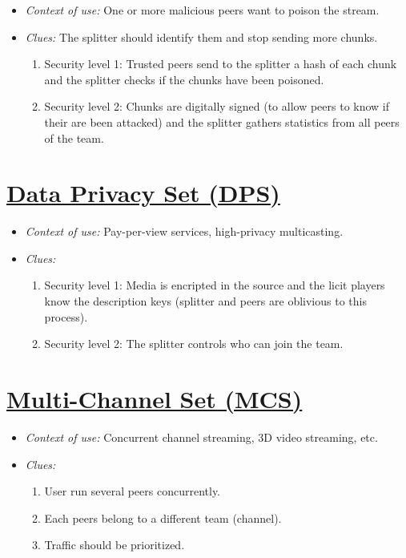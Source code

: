 \documentclass{article}
\begin{document}
\begin{itemize}
\item \emph{Context of use:} One or more malicious peers want to
  poison the stream.
\item \emph{Clues:} The splitter should identify them and stop sending
  more chunks.
  \begin{enumerate}
  \item Security level 1: Trusted peers send to the splitter a hash of
    each chunk and the splitter checks if the chunks have been
    poisoned.
    \item Security level 2: Chunks are digitally signed (to allow
      peers to know if their are been attacked) and the splitter
      gathers statistics from all peers of the team.
  \end{enumerate}
\end{itemize}


\section{\href{http://www.p2psp.org/en/p2psp-protocol?cap=indexsu12.xht\#x21-180004.12}{Data Privacy Set (DPS)}}

\begin{itemize}
\item \emph{Context of use:} Pay-per-view services, high-privacy multicasting.
\item \emph{Clues:}
    \begin{enumerate}
  \item Security level 1: Media is encripted in the source and the
    licit players know the description keys (splitter and peers are
    oblivious to this process).
    \item Security level 2: The splitter controls who can join the
      team.
  \end{enumerate}
\end{itemize}


\section{\href{http://www.p2psp.org/en/p2psp-protocol?cap=indexsu11.xht\#x20-160004.11}{Multi-Channel Set (MCS)}}

\begin{itemize}
\item \emph{Context of use:} Concurrent channel streaming, 3D video streaming, etc.
\item \emph{Clues:}
  \begin{enumerate}
  \item User run several peers concurrently.
  \item Each peers belong to a different team (channel).
  \item Traffic should be prioritized.
  \end{enumerate}
\end{itemize}
    
\end{document}
